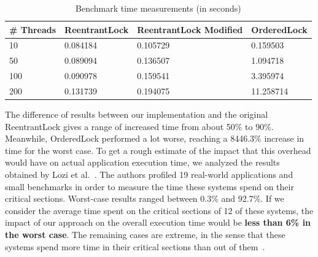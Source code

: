 \begin{table}
\begin{center}
\caption{Benchmark time measurements (in seconds)}\label{tab:overhead}
\begin{tabular}{|l|l|l|l|}
\hline
\# Threads & ReentrantLock & ReentrantLock Modified & OrderedLock \\
\hline
10 & 0.084184 & 0.105729 & 0.159503\\
50 & 0.089094 & 0.136507 & 1.094718\\
100 & 0.090978 & 0.159541 & 3.395974\\
200 & 0.131739 & 0.194075 & 11.258714\\
\hline
\end{tabular}
\end{center}
\end{table}

The difference of results between our implementation and the original ReentrantLock gives a range of increased time from about 50\% to 90\%. Meanwhile, OrderedLock performed a lot worse, reaching a 8446.3\% increase in time for the worst case. To get a rough estimate of the impact that this overhead would have on actual application execution time, we analyzed the results obtained by Lozi et al.~\cite{lozi}. The authors profiled 19 real-world applications and small benchmarks in order to measure the time these systems spend on their critical sections. Worst-case results ranged between 0.3\% and 92.7\%. If we consider the average time spent on the critical sections of 12 of these systems, the impact of our approach on the overall execution time would be \textbf{less than 6\% in the worst case}. The remaining cases are extreme, in the sense that these systems spend more time in their critical sections than out of them~\cite{lozi}. 

